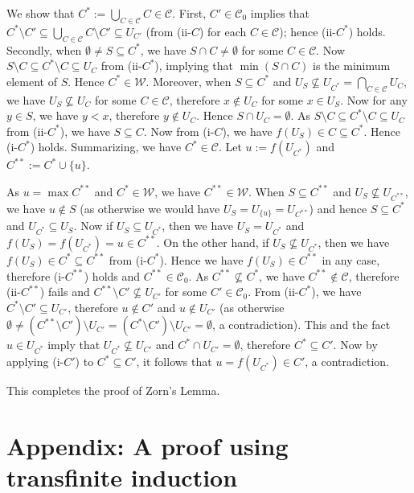 \documentclass{article}
\begin{document}
We show that $C^* := \bigcup_{C \in \mathcal{C}} C \in \mathcal{C}$.
First, $C' \in \mathcal{C}_0$ implies that $C^* \setminus C' \subseteq \bigcup_{C \in \mathcal{C}} C \setminus C' \subseteq U_{C'}$ (from (ii-$C$) for each $C \in \mathcal{C}$); hence (ii-$C^*$) holds.
Secondly, when $\emptyset \neq S \subseteq C^*$, we have $S \cap C \neq \emptyset$ for some $C \in \mathcal{C}$.
Now $S \setminus C \subseteq C^* \setminus C \subseteq U_C$ from (ii-$C^*$), implying that $\min(S \cap C)$ is the minimum element of $S$.
Hence $C^* \in \mathcal{W}$.
Moreover, when $S \subseteq C^*$ and $U_S \not\subseteq U_{C^*} = \bigcap_{C \in \mathcal{C}} U_C$, we have $U_S \not\subseteq U_C$ for some $C \in \mathcal{C}$, therefore $x \not\in U_C$ for some $x \in U_S$.
Now for any $y \in S$, we have $y < x$, therefore $y \not\in U_C$.
Hence $S \cap U_C = \emptyset$.
As $S \setminus C \subseteq C^* \setminus C \subseteq U_C$ from (ii-$C^*$), we have $S \subseteq C$.
Now from (i-$C$), we have $f(U_S) \in C \subseteq C^*$.
Hence (i-$C^*$) holds.
Summarizing, we have $C^* \in \mathcal{C}$.
Let $u := f(U_{C^*})$ and $C^{**} := C^* \cup \{u\}$.

As $u = \max C^{**}$ and $C^* \in \mathcal{W}$, we have $C^{**} \in \mathcal{W}$.
When $S \subseteq C^{**}$ and $U_S \not\subseteq U_{C^{**}}$, we have $u \not\in S$ (as otherwise we would have $U_S = U_{\{u\}} = U_{C^{**}}$) and hence $S \subseteq C^*$ and $U_{C^*} \subseteq U_S$.
Now if $U_S \subseteq U_{C^*}$, then we have $U_S = U_{C^*}$ and $f(U_S) = f(U_{C^*}) = u \in C^{**}$.
On the other hand, if $U_S \not\subseteq U_{C^*}$, then we have $f(U_S) \in C^* \subseteq C^{**}$ from (i-$C^*$).
Hence we have $f(U_S) \in C^{**}$ in any case, therefore (i-$C^{**}$) holds and $C^{**} \in \mathcal{C}_0$.
As $C^{**} \not\subseteq C^*$, we have $C^{**} \not\in \mathcal{C}$, therefore (ii-$C^{**}$) fails and $C^{**} \setminus C' \not\subseteq U_{C'}$ for some $C' \in \mathcal{C}_0$.
From (ii-$C^*$), we have $C^* \setminus C' \subseteq U_{C'}$, therefore $u \not\in C'$ and $u \not\in U_{C'}$ (as otherwise $\emptyset \neq (C^{**} \setminus C') \setminus U_{C'} = (C^* \setminus C') \setminus U_{C'} = \emptyset$, a contradiction).
This and the fact $u \in U_{C^*}$ imply that $U_{C^*} \not\subseteq U_{C'}$ and $C^* \cap U_{C'} = \emptyset$, therefore $C^* \subseteq C'$.
Now by applying (i-$C'$) to $C^* \subseteq C'$, it follows that $u = f(U_{C^*}) \in C'$, a contradiction.

This completes the proof of Zorn's Lemma.


\section*{Appendix: A proof using transfinite induction}
\end{document}
